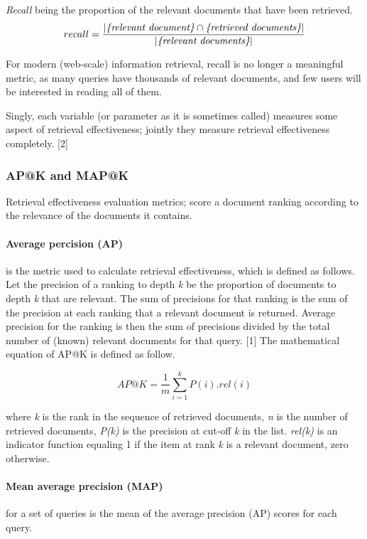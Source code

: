 \emph{Recall} being the proportion of the relevant documents that have been retrieved.
\begin{equation}
	recall = \frac{|\emph{\{relevant document\}} \cap \emph{\{retrieved documents\}}|}{|\emph{\{relevant documents\}}|}
	\label{eq:recall}
\end{equation}

For modern (web-scale) information retrieval, recall is no longer a meaningful metric, as many queries have thousands of relevant documents, and few users will be interested in reading all of them.

Singly, each variable (or parameter as it is sometimes called) measures some aspect of retrieval effectiveness; jointly they measure retrieval effectiveness completely. [2]

\subsubsection{AP@K and MAP@K}
\label{AP@K and MAP@K}
Retrieval effectiveness evaluation metrics; score a document ranking according to the relevance of the documents it contains. 
\paragraph*{Average percision (AP)} is the metric used to calculate retrieval effectiveness, which is defined as follows. 
Let the precision of a ranking to depth \emph{k} be
the proportion of documents to depth \emph{k} that are relevant. The sum of precisions for that
ranking is the sum of the precision at each ranking that a relevant document is returned.
Average precision for the ranking is then the sum of precisions divided by the total number of (known) relevant documents for that query. [1] 
The mathematical equation of AP@K is defined as follow.

\begin{equation}
	AP@K = \frac{1}{m}\sum_{i=1}^{k}P(i).rel(i)
	\label{eq:ap@k}
\end{equation}

where \emph{k} is the rank in the sequence of retrieved documents, \emph{n} is the number of retrieved documents, \emph{P(k)} is the precision at cut-off \emph{k} in the list. \emph{rel(k)}
is an indicator function equaling 1 if the item at rank \emph{k} is a relevant document, zero otherwise.

\paragraph*{Mean average precision (MAP)} for a set of queries is the mean of the average precision (AP) scores for each query.


